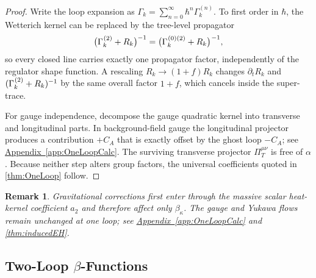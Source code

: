 \documentclass[pdflatex,sn-mathphys-num]{sn-jnl}
\theoremstyle{thmstyleone}
\theoremstyle{thmstyletwo}%
\newtheorem{remark}{Remark}%
\theoremstyle{thmstylethree}%
\newcommand{\sm}{\hspace{.065em}}
\newcommand{\appref}[1]{\hyperref[#1]{Appendix~\ref*{#1}}}
\newcommand{\smexp}[1]{^{\sm #1}}
\begin{document}
\begin{proof}
Write the loop expansion as
\(
  \Gamma_{k}
  =\sum_{n=0}^{\infty}\hbar^{n}\Gamma_{k}^{(n)}.
\)
To first order in \(\hbar\), the Wetterich kernel can be replaced by the
tree-level propagator
\[
  \bigl(\Gamma_{k}\smexp{(2)}+R_{k}\bigr)^{-1}
  =
  \bigl(\Gamma_{k}\smexp{(0)(2)}+R_{k}\bigr)\smexp{-1},
\]
so every closed line carries exactly one propagator factor,
independently of the regulator shape function. A rescaling
\(R_{k}\to(1+f)R_{k}\) changes \(\partial_{t}R_{k}\) and 
\((\Gamma_{k}\smexp{(2)}+R_{k})^{-1}\) by the same overall factor
\(1+f\), which cancels inside the super-trace.

For gauge independence, decompose the gauge quadratic kernel into
transverse and longitudinal parts.  In background-field gauge the
longitudinal projector produces a contribution \(+C_{A}\) that is
exactly offset by the ghost loop \(-C_{A}\); see \appref{app:OneLoopCalc}.
The surviving transverse projector \(\Pi^{\mu\nu}_{T}\)
is free of \(\alpha\).  Because neither step alters group factors, the
universal coefficients quoted in \autoref{thm:OneLoop} follow.
\end{proof}

\begin{remark}
Gravitational corrections first enter through the massive scalar
heat-kernel coefficient \(a_{2}\) and therefore affect only
\(\beta_{\kappa}\).  The gauge and Yukawa flows remain unchanged at one
loop; see \appref{app:OneLoopCalc} and \autoref{thm:inducedEH}.
\end{remark}

\subsection{Two-Loop \texorpdfstring{$\beta$}{Beta}-Functions}
\label{subsec:TwoLoop}
\end{document}
